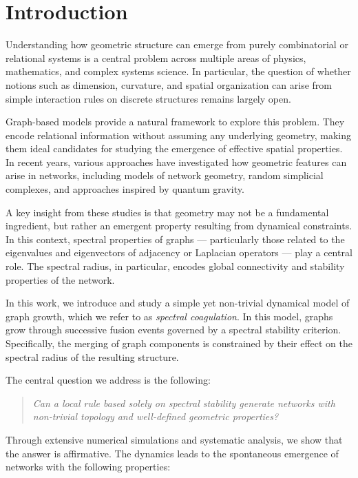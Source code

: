 \documentclass[11pt]{article}
\begin{document}
\section{Introduction}

Understanding how geometric structure can emerge from purely combinatorial
or relational systems is a central problem across multiple areas of physics,
mathematics, and complex systems science. In particular, the question of
whether notions such as dimension, curvature, and spatial organization can
arise from simple interaction rules on discrete structures remains largely open.

Graph-based models provide a natural framework to explore this problem.
They encode relational information without assuming any underlying geometry,
making them ideal candidates for studying the emergence of effective spatial
properties. In recent years, various approaches have investigated how
geometric features can arise in networks, including models of network geometry,
random simplicial complexes, and approaches inspired by quantum gravity.

A key insight from these studies is that geometry may not be a fundamental
ingredient, but rather an emergent property resulting from dynamical constraints.
In this context, spectral properties of graphs — particularly those related
to the eigenvalues and eigenvectors of adjacency or Laplacian operators —
play a central role. The spectral radius, in particular, encodes global
connectivity and stability properties of the network.

In this work, we introduce and study a simple yet non-trivial dynamical model
of graph growth, which we refer to as \emph{spectral coagulation}. In this model,
graphs grow through successive fusion events governed by a spectral stability
criterion. Specifically, the merging of graph components is constrained by
their effect on the spectral radius of the resulting structure.

The central question we address is the following:

\begin{quote}
\emph{Can a local rule based solely on spectral stability generate networks
with non-trivial topology and well-defined geometric properties?}
\end{quote}

Through extensive numerical simulations and systematic analysis, we show that
the answer is affirmative. The dynamics leads to the spontaneous emergence of
networks with the following properties:
\end{document}
